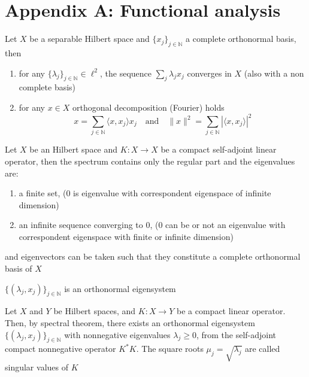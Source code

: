 \section{Appendix A: Functional analysis}
\begin{theorem}[Parseval]
 Let $X$ be a separable Hilbert space and $\{x_j\}_{j\in\mathbb{N}}$ a complete orthonormal basis, then
 \begin{enumerate}
  \item for any $\{\lambda_j\}_{j\in\mathbb{N}} \in \ell ^2$, the sequence $\sum_{j}\lambda_jx_j$ converges in $X$ (also with a non complete basis)
  \item for any $x \in X$ orthogonal decomposition (Fourier) holds
  \begin{equation}
   x = \sum_{j \in \mathbb{N}} \langle x, x_j\rangle x_j \quad \text{and} \quad \|x\|^2=\sum_{j \in \mathbb{N}} |\langle x, x_j\rangle|^2
  \end{equation}
 \end{enumerate}
\end{theorem}

\begin{theorem}
 Let $X$ be an Hilbert space and $K:X\to X$ be a compact self-adjoint linear operator, then the spectrum contains only the regular part and the eigenvalues are:
 \begin{enumerate}
  \item a finite set, (0 is eigenvalue with correspondent eigenspace of infinite dimension)
  \item an infinite sequence converging to 0, (0 can be or not an eigenvalue with correspondent eigenspace with finite or infinite dimension)
 \end{enumerate}
 and eigenvectors can be taken such that they constitute a complete orthonormal basis of $X$
 \begin{center}
  $\{(\lambda_j, x_j)\}_{j\in\mathbb{N}}$ is an orthonormal eigensystem
 \end{center}
\end{theorem}

\begin{definition}
 Let $X$ and $Y$ be Hilbert spaces, and $K:X\to Y$ be a compact linear operator. Then, by spectral theorem, there exists an orthonormal eigensystem $\{(\lambda_j,x_j)\}_{j\in\mathbb{N}}$ with nonnegative eigenvalues $\lambda_j \geq 0$, from the self-adjoint compact nonnegative operator $K^*K$. The square roots $\mu_j = \sqrt{\lambda_j}$ are called singular values of $K$
\end{definition}

